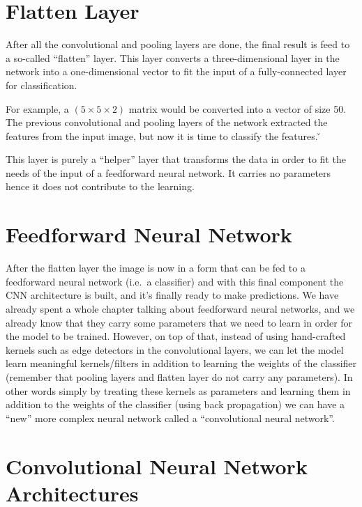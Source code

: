 \section{Flatten Layer}

After all the convolutional and pooling layers are done, the final result is feed to a so-called ``flatten'' layer.
This layer converts a three-dimensional layer in the network into a one-dimensional vector to fit the input of a
fully-connected layer for classification.

\be
For example, a $(5 \times 5 \times 2)$ matrix would be converted into a vector of size 50. The previous convolutional
and pooling layers of the network extracted the features from the input image, but now it is time to classify the
features. \v

\ee

This layer is purely a ``helper'' layer that transforms the data in order to fit the needs of the input of a
feedforward neural network. It carries no parameters hence it does not contribute to the learning.

\section{Feedforward Neural Network}

After the flatten layer the image is now in a form that can be fed to a feedforward neural network (i.e.\ a classifier)
and with this final component the CNN architecture is built, and it's finally ready to make predictions. We have
already spent a whole chapter talking about feedforward neural networks, and we already know that they carry some
parameters that we need to learn in order for the model to be trained. However, on top of that, instead of using
hand-crafted kernels such as edge detectors in the convolutional layers, we can let the model learn meaningful
kernels/filters in addition to learning the weights of the classifier (remember that pooling layers and flatten layer
do not carry any parameters). In other words simply by treating these kernels as parameters and learning them in
addition to the weights of the classifier (using back propagation) we can have a ``new'' more complex neural network
called a ``convolutional neural network''.

\section{Convolutional Neural Network Architectures}


